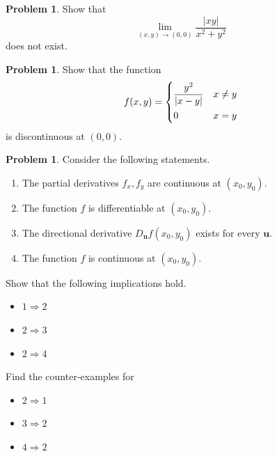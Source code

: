 \documentclass[t]{beamer}
\theoremstyle{plain}
\theoremstyle{definition}
\newtheorem{prob}[thm]{Problem}
\begin{document}
\begin{frame}
\begin{prob}
	Show that 
	\[\lim_{(x,y)\to(0,0)} \frac{|xy|}{x^2+y^2}\]
	does not exist.
\end{prob}
\end{frame}

\begin{frame}
\begin{prob}
	Show that the function
	$$f(x,y)=\begin{dcases}
	\frac{y^2}{|x-y|} & x\neq y\\
	0 & x=y\end{dcases}$$
	is discontinuous at $(0,0)$.
\end{prob}	
\end{frame}

\begin{frame}
\begin{prob}
	Consider the following statements.
	\begin{enumerate}
		\item The partial derivatives $f_x,f_y$ are continuous at $(x_0,y_0)$.
		\item The function $f$ is differentiable at $(x_0,y_0)$.
		\item The directional derivative $D_{\mathbf u}f(x_0,y_0)$ exists for every $\mathbf u$.
		\item The function $f$ is continuous at $(x_0,y_0)$.
	\end{enumerate}
	Show that the following implications hold.
	\begin{itemize}
		\item $1\Rightarrow 2$
		\item $2\Rightarrow 3$
		\item $2\Rightarrow 4$
	\end{itemize}
	Find the counter-examples for 
	\begin{itemize}
		\item $2\Rightarrow 1$
		\item $3\Rightarrow 2$
		\item $4\Rightarrow 2$
	\end{itemize}
\end{prob}	
\end{frame}
\end{document}
